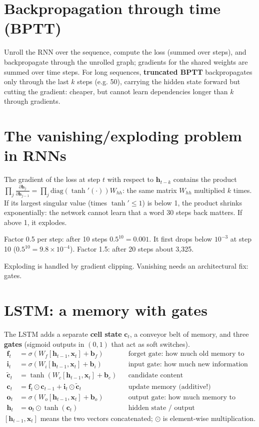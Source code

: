 \section{Backpropagation through time (BPTT)}
Unroll the RNN over the sequence, compute the loss (summed over steps), and backpropagate through the unrolled graph; gradients for the shared weights
are summed over time steps. For long sequences, \textbf{truncated BPTT} backpropagates only through the last $k$ steps (e.g. 50), carrying the hidden state
forward but cutting the gradient: cheaper, but cannot learn dependencies longer than $k$ through gradients.

\section{The vanishing/exploding problem in RNNs}
The gradient of the loss at step $t$ with respect to $\mathbf h_{t-k}$ contains the product $\prod_{j}\frac{\partial\mathbf h_j}{\partial\mathbf h_{j-1}} = \prod_j
\text{diag}(\tanh'(\cdot))W_{hh}$: the same matrix $W_{hh}$ multiplied $k$ times. If its largest singular value (times $\tanh'\le1$) is below 1, the product
shrinks exponentially: the network cannot learn that a word 30 steps back matters. If above 1, it explodes.
\begin{example}
Factor 0.5 per step: after 10 steps $0.5^{10} = 0.001$. It first drops below $10^{-3}$ at step 10 ($0.5^{10} = 9.8\times10^{-4}$). Factor 1.5: after 20 steps about
3{,}325.
\end{example}
Exploding is handled by gradient clipping. Vanishing needs an architectural fix: gates.

\section{LSTM: a memory with gates}
The LSTM adds a separate \textbf{cell state} $\mathbf c_t$, a conveyor belt of memory, and three \textbf{gates} (sigmoid outputs in $(0,1)$ that act as soft switches).
\begin{align*}
\mathbf f_t &= \sigma(W_f[\mathbf h_{t-1},\mathbf x_t] + \mathbf b_f) &&\text{forget gate: how much old memory to keep}\\
\mathbf i_t &= \sigma(W_i[\mathbf h_{t-1},\mathbf x_t] + \mathbf b_i) &&\text{input gate: how much new information to write}\\
\tilde{\mathbf c}_t &= \tanh(W_c[\mathbf h_{t-1},\mathbf x_t] + \mathbf b_c) &&\text{candidate content}\\
\mathbf c_t &= \mathbf f_t\odot\mathbf c_{t-1} + \mathbf i_t\odot\tilde{\mathbf c}_t &&\text{update memory (additive!)}\\
\mathbf o_t &= \sigma(W_o[\mathbf h_{t-1},\mathbf x_t] + \mathbf b_o) &&\text{output gate: how much memory to reveal}\\
\mathbf h_t &= \mathbf o_t\odot\tanh(\mathbf c_t) &&\text{hidden state / output}
\end{align*}
$[\mathbf h_{t-1},\mathbf x_t]$ means the two vectors concatenated; $\odot$ is element-wise multiplication.

